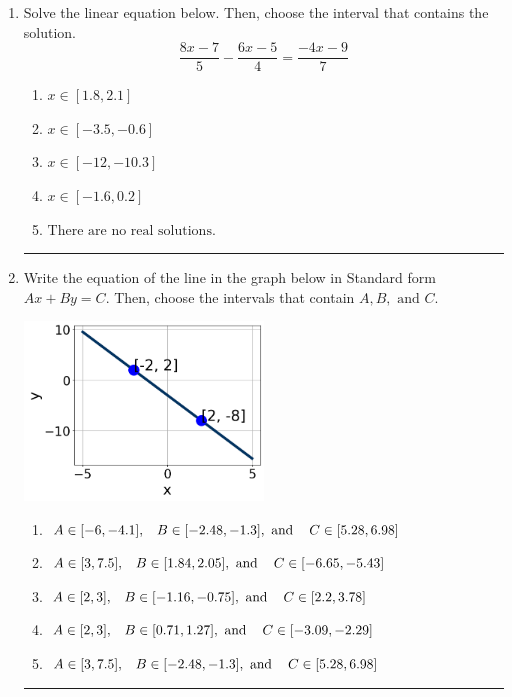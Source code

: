 \documentclass[14pt]{extbook}
\newcommand{\litem}[1]{\item#1\hspace*{-1cm}\rule{\textwidth}{0.4pt}}
\begin{document}
\begin{enumerate}
\litem{
Solve the linear equation below. Then, choose the interval that contains the solution.\[ \frac{8x -7}{5} - \frac{6x -5}{4} = \frac{-4x -9}{7} \]\begin{enumerate}[label=\Alph*.]
\item \( x \in [1.8, 2.1] \)
\item \( x \in [-3.5, -0.6] \)
\item \( x \in [-12, -10.3] \)
\item \( x \in [-1.6, 0.2] \)
\item \( \text{There are no real solutions.} \)

\end{enumerate} }
\litem{
Write the equation of the line in the graph below in Standard form $Ax+By=C$. Then, choose the intervals that contain $A, B, \text{ and } C$.
\begin{center}
    \includegraphics[width=0.5\textwidth]{../Figures/linearGraphToStandardB.png}
\end{center}
\begin{enumerate}[label=\Alph*.]
\item \( A \in [-6, -4.1], \hspace{3mm} B \in [-2.48, -1.3], \text{ and } \hspace{3mm} C \in [5.28, 6.98] \)
\item \( A \in [3, 7.5], \hspace{3mm} B \in [1.84, 2.05], \text{ and } \hspace{3mm} C \in [-6.65, -5.43] \)
\item \( A \in [2, 3], \hspace{3mm} B \in [-1.16, -0.75], \text{ and } \hspace{3mm} C \in [2.2, 3.78] \)
\item \( A \in [2, 3], \hspace{3mm} B \in [0.71, 1.27], \text{ and } \hspace{3mm} C \in [-3.09, -2.29] \)
\item \( A \in [3, 7.5], \hspace{3mm} B \in [-2.48, -1.3], \text{ and } \hspace{3mm} C \in [5.28, 6.98] \)


\end{enumerate}}
\end{enumerate}
\end{document}
